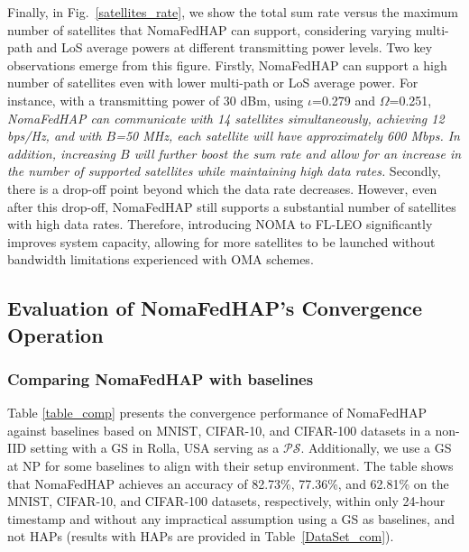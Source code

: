 \documentclass[letter,journal]{IEEEtran}
\begin{document}
Finally, in Fig.~\ref{satellites_rate}, we show the total sum rate versus the maximum number of satellites that NomaFedHAP can support, considering varying multi-path and LoS average powers at different transmitting power levels. Two key observations emerge from this figure. Firstly, NomaFedHAP can support a high number of satellites even with lower multi-path or LoS average power. For instance, with a transmitting power of 30 dBm, using $\iota$=0.279 and $\Omega$=0.251,  {\em  NomaFedHAP can communicate with 14 satellites simultaneously, achieving 12 bps/Hz, and with $B$=50 MHz, each satellite will have approximately 600 Mbps. In addition, increasing $B$ will further boost the sum rate and allow for an increase in the number of supported satellites while maintaining high data rates.} Secondly, there is a drop-off point beyond which the data rate decreases. However, even after this drop-off, NomaFedHAP still supports a substantial number of satellites with high data rates. Therefore, introducing NOMA to FL-LEO significantly improves system capacity, allowing for more satellites to be launched without bandwidth limitations experienced with OMA schemes.


\subsection{Evaluation of NomaFedHAP's Convergence  Operation} %


\subsubsection{\bf Comparing NomaFedHAP with baselines} Table \ref{table_comp} presents the convergence performance of NomaFedHAP against baselines based on MNIST, CIFAR-10, and CIFAR-100 datasets in a non-IID setting with a GS in Rolla, USA serving as a $\mathcal {PS}$. Additionally, we use a GS at NP for some baselines to align with their setup environment. The table shows that NomaFedHAP achieves an accuracy of 82.73\%, 77.36\%, and 62.81\% on the MNIST, CIFAR-10, and CIFAR-100 datasets, respectively, within only 24-hour timestamp and without any impractical assumption using a GS as baselines, and not HAPs (results with HAPs are provided in Table~\ref{DataSet_com}). %
\end{document}
